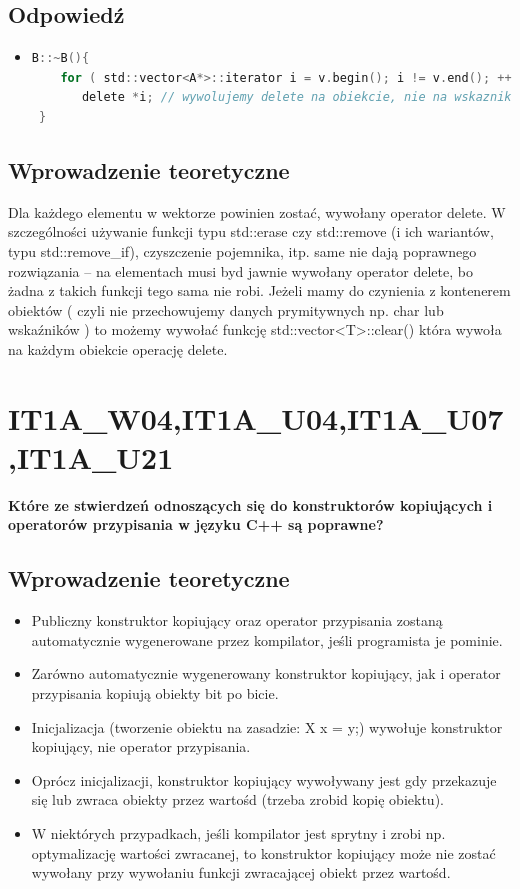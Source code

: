 \subsection{Odpowiedź}
\begin{itemize}
\item 
\begin{lstlisting}[language=c]
 B::~B(){
    for ( std::vector<A*>::iterator i = v.begin(); i != v.end(); ++i )
       delete *i; // wywolujemy delete na obiekcie, nie na wskazniku do niego!
 }
\end{lstlisting}
\end{itemize}

\subsection{Wprowadzenie teoretyczne}
Dla każdego elementu w wektorze powinien zostać, wywołany operator delete. W szczególności używanie funkcji typu std::erase czy std::remove (i ich wariantów, typu std::remove\_if), czyszczenie pojemnika, itp. same nie dają poprawnego rozwiązania – na elementach musi byd jawnie wywołany operator delete, bo żadna z takich funkcji tego sama nie robi. Jeżeli mamy do czynienia z kontenerem obiektów ( czyli nie przechowujemy danych prymitywnych np. char lub wskaźników ) to możemy wywołać funkcję std::vector<T>::clear() która wywoła na każdym obiekcie operację delete.


\section{IT1A\_W04,IT1A\_U04,IT1A\_U07,IT1A\_U21}
\textbf{Które ze stwierdzeń odnoszących się do konstruktorów kopiujących i operatorów przypisania w języku C++ są poprawne?}

\subsection{Wprowadzenie teoretyczne}
\begin{itemize}
\item Publiczny konstruktor kopiujący oraz operator przypisania zostaną automatycznie wygenerowane przez kompilator, jeśli programista je pominie.
\item Zarówno automatycznie wygenerowany konstruktor kopiujący, jak i operator przypisania kopiują obiekty bit po bicie.
\item Inicjalizacja (tworzenie obiektu na zasadzie: X x = y;) wywołuje konstruktor kopiujący, nie operator przypisania.
\item Oprócz inicjalizacji, konstruktor kopiujący wywoływany jest gdy przekazuje się lub zwraca obiekty przez wartośd (trzeba zrobid kopię obiektu).
\item W niektórych przypadkach, jeśli kompilator jest sprytny i zrobi np. optymalizację wartości zwracanej, to konstruktor kopiujący może nie zostać wywołany przy wywołaniu funkcji zwracającej obiekt przez wartośd.
\end{itemize}


